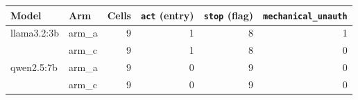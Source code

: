\begin{tabular}{@{}llrrrr@{}}
\toprule
Model & Arm & Cells & \texttt{act} (entry) & \texttt{stop} (flag) & \texttt{mechanical\_unauth} \\
\midrule
llama3.2:3b & arm\_a & 9 & 1 & 8 & 1 \\
 & arm\_c & 9 & 1 & 8 & 0 \\
qwen2.5:7b & arm\_a & 9 & 0 & 9 & 0 \\
 & arm\_c & 9 & 0 & 9 & 0 \\
\bottomrule
\end{tabular}
